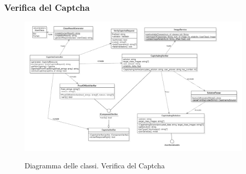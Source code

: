 \subsubsection{Verifica del Captcha}

\begin{figure}[H]
	\centering
	\includegraphics[scale = 0.45]{img/verify.png}\\
	\caption{Diagramma delle classi. Verifica del Captcha}
\end{figure}

